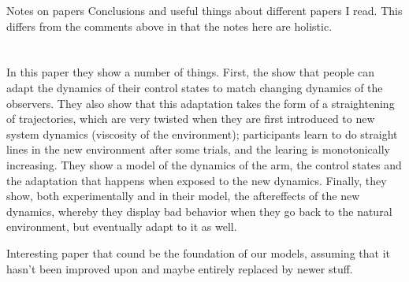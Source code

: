 \documentclass{report}
\begin{document}
\begin{chapter}{Notes on papers}
Conclusions and useful things about different papers I read. This differs from the comments above in that the notes here are holistic.

\section{\cite{Shadmehr_Adaptive_1994}}
In this paper they show a number of things. First, the show that people can adapt the dynamics of their control states to match changing dynamics of the observers. They also show that this adaptation takes the form of a straightening of trajectories, which are very twisted when they are first introduced to new system dynamics (viscosity of the environment); participants learn to do straight lines in the new environment after some trials, and the learing is monotonically increasing. They show a model of the dynamics of the arm, the control states and the adaptation that happens when exposed to the new dynamics. Finally, they show, both experimentally and in their model, the aftereffects of the new dynamics, whereby they display bad behavior when they go back to the natural environment, but eventually adapt to it as well.

Interesting paper that cound be the foundation of our models, assuming that it hasn't been improved upon and maybe entirely replaced by newer stuff.

\end{chapter}



\end{document}
